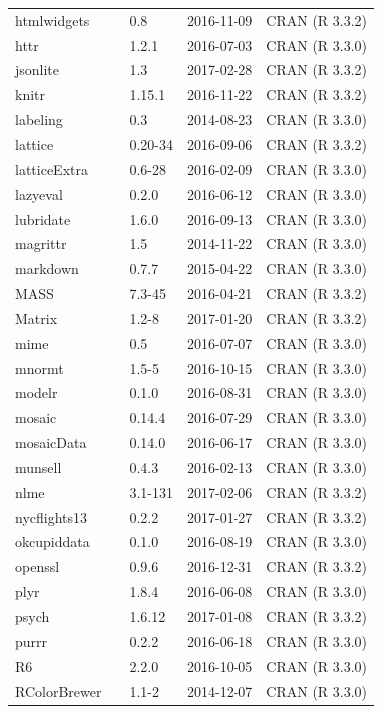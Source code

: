 \documentclass[]{tufte-book}
\begin{document}
\begin{longtable}{lllll}
htmlwidgets &  & 0.8 & 2016-11-09 & CRAN (R 3.3.2)\\
httr &  & 1.2.1 & 2016-07-03 & CRAN (R 3.3.0)\\
jsonlite &  & 1.3 & 2017-02-28 & CRAN (R 3.3.2)\\
\addlinespace
knitr &  & 1.15.1 & 2016-11-22 & CRAN (R 3.3.2)\\
labeling &  & 0.3 & 2014-08-23 & CRAN (R 3.3.0)\\
lattice &  & 0.20-34 & 2016-09-06 & CRAN (R 3.3.2)\\
latticeExtra &  & 0.6-28 & 2016-02-09 & CRAN (R 3.3.0)\\
lazyeval &  & 0.2.0 & 2016-06-12 & CRAN (R 3.3.0)\\
\addlinespace
lubridate &  & 1.6.0 & 2016-09-13 & CRAN (R 3.3.0)\\
magrittr &  & 1.5 & 2014-11-22 & CRAN (R 3.3.0)\\
markdown &  & 0.7.7 & 2015-04-22 & CRAN (R 3.3.0)\\
MASS &  & 7.3-45 & 2016-04-21 & CRAN (R 3.3.2)\\
Matrix &  & 1.2-8 & 2017-01-20 & CRAN (R 3.3.2)\\
\addlinespace
mime &  & 0.5 & 2016-07-07 & CRAN (R 3.3.0)\\
mnormt &  & 1.5-5 & 2016-10-15 & CRAN (R 3.3.0)\\
modelr &  & 0.1.0 & 2016-08-31 & CRAN (R 3.3.0)\\
mosaic &  & 0.14.4 & 2016-07-29 & CRAN (R 3.3.0)\\
mosaicData &  & 0.14.0 & 2016-06-17 & CRAN (R 3.3.0)\\
\addlinespace
munsell &  & 0.4.3 & 2016-02-13 & CRAN (R 3.3.0)\\
nlme &  & 3.1-131 & 2017-02-06 & CRAN (R 3.3.2)\\
nycflights13 &  & 0.2.2 & 2017-01-27 & CRAN (R 3.3.2)\\
okcupiddata &  & 0.1.0 & 2016-08-19 & CRAN (R 3.3.0)\\
openssl &  & 0.9.6 & 2016-12-31 & CRAN (R 3.3.2)\\
\addlinespace
plyr &  & 1.8.4 & 2016-06-08 & CRAN (R 3.3.0)\\
psych &  & 1.6.12 & 2017-01-08 & CRAN (R 3.3.2)\\
purrr &  & 0.2.2 & 2016-06-18 & CRAN (R 3.3.0)\\
R6 &  & 2.2.0 & 2016-10-05 & CRAN (R 3.3.0)\\
RColorBrewer &  & 1.1-2 & 2014-12-07 & CRAN (R 3.3.0)\\

\end{longtable}
\end{document}
